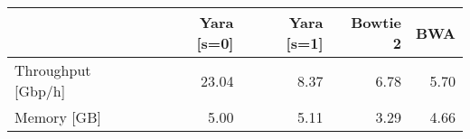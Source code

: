 \begin{tabular}{lrrrr}
  \toprule
 & Yara [s=0] & Yara [s=1] & Bowtie 2 & BWA \\ 
  \midrule
Throughput [Gbp/h] & 23.04 & 8.37 & 6.78 & 5.70 \\ 
  Memory [GB] & 5.00 & 5.11 & 3.29 & 4.66 \\ 
   \bottomrule
\end{tabular}
